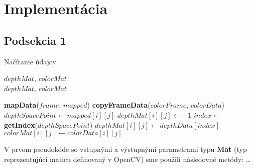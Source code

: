 \newpage
\section{Implementácia}
\lipsum[1]

\subsection{Podsekcia 1} \label{iclass}
\noindent
\lipsum[1]

\begin{algorithm}[H]
	\small
	\caption{Načítanie údajov}\label{kinect}
	\algorithmicrequire $depthMat$, $colorMat$\\
	\algorithmicensure $depthMat$, $colorMat$
	
	\begin{algorithmic}[1]
		\State \textbf{mapData}($frame$, $mapped$)
		\State \textbf{copyFrameData}($colorFrame$, $colorData$)
		\State $depthSpacePoint \gets mapped[i][j]$
		\State $depthMat[i][j]\gets -1$
		\Else
		\State $index\gets$ \textbf{getIndex}($depthSpacePoint$)
		\State $depthMat[i][j]\gets depthData[index]$
		\EndIf
		\State $colorMat[i][j]\gets colorData[i][j]$
		\EndFor
		\EndFor
		\EndIf
		\EndIf
		\EndProcedure
	\end{algorithmic}
\end{algorithm}
\noindent
V prvom pseudokóde so vstupnými a výstupnými parametrami typu \textbf{Mat} (typ reprezentujúci maticu definovaný v OpenCV) sme použili následovné metódy: \dots